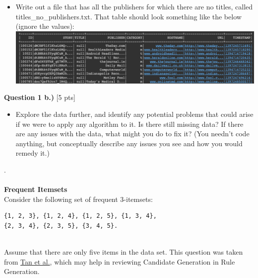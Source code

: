\documentclass[paper=a4, fontsize=11pt]{scrartcl} %
\begin{document}
\begin{itemize}
    \item Write out a file that has all the publishers for which there are no titles, called titles\_no\_publishers.txt. That table should look something like the below (ignore the values): \\
    \includegraphics[width=150mm]{images/title_no_pub.png} \\
\end{itemize} 

{\Large \textbf{Question 1 b.)} [5 pts]} \\
\begin{itemize}
\item Explore the data further, and identify any potential problems that could arise if we were to apply any algorithm to it. Is there still missing data? If there are any issues with the data, what might you do to fix it? (You needn't code anything, but conceptually describe any issues you see and how you would remedy it.)
\end{itemize}
.\\
\\
{\huge \textbf{Frequent Itemsets}} \\

Consider the following set of frequent 3-itemsets:

\begin{verbatim}
{1, 2, 3}, {1, 2, 4}, {1, 2, 5}, {1, 3, 4}, 
{2, 3, 4}, {2, 3, 5}, {3, 4, 5}.
\end{verbatim} \\

Assume that there are only five items in the data set. This question was taken from \href{https://www-users.cse.umn.edu/~kumar001/dmbook/ch5_association_analysis.pdf}{Tan et al.}, which may help in reviewing Candidate Generation in Rule Generation.\\
\end{document}
